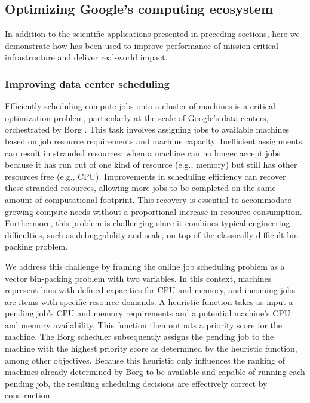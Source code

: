 \subsection{Optimizing Google's computing ecosystem}

In addition to the scientific applications presented in preceding sections, here we demonstrate how \method has been used to improve performance of mission-critical infrastructure and deliver real-world impact.

\subsubsection{Improving data center scheduling}

Efficiently scheduling compute jobs onto a cluster of machines is a critical optimization problem, particularly at the scale of Google's data centers, orchestrated by Borg \cite{43438}. This task involves assigning jobs to available machines based on job resource requirements and machine capacity. Inefficient assignments can result in stranded resources: when a machine can no longer accept jobs because it has run out of one kind of resource (e.g., memory) but still has other resources free (e.g., CPU). Improvements in scheduling efficiency can recover these stranded resources, allowing more jobs to be completed on the same amount of computational footprint. This recovery is essential to accommodate growing compute needs without a proportional increase in resource consumption. Furthermore, this problem is challenging since it combines typical engineering difficulties, such as debuggability and scale, on top of the classically difficult bin-packing problem.

We address this challenge by framing the online job scheduling problem as a vector bin-packing problem with two variables. In this context, machines represent bins with defined capacities for CPU and memory, and incoming jobs are items with specific resource demands. A heuristic function takes as input a pending job’s CPU and memory requirements and a potential machine’s CPU and memory availability. This function then outputs a priority score for the machine. The Borg scheduler subsequently assigns the pending job to the machine with the highest priority score as determined by the heuristic function, among other objectives. Because this heuristic only influences the ranking of machines already determined by Borg to be available and capable of running each pending job, the resulting scheduling decisions are effectively correct by construction.

